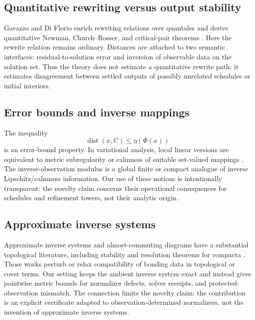 \documentclass[11pt]{article}
\theoremstyle{definition}
\theoremstyle{remark}
\numberwithin{equation}{section}
\newcommand{\dist}{\operatorname{dist}}
\begin{document}
\subsection{Quantitative rewriting versus output stability}

Gavazzo and Di Florio enrich rewriting relations over quantales and derive quantitative Newman, Church--Rosser, and critical-pair theorems \citep{GavazzoDiFlorio2022}.  Here the rewrite relation remains ordinary.  Distances are attached to two semantic interfaces: residual-to-solution error and inversion of observable data on the solution set.  Thus the theory does not estimate a quantitative rewrite path; it estimates disagreement between settled outputs of possibly unrelated schedules or initial interiors.

\subsection{Error bounds and inverse mappings}

The inequality
\[
 \dist(x,C)\le \eta(\Phi(x))
\]
is an error-bound property.  In variational analysis, local linear versions are equivalent to metric subregularity or calmness of suitable set-valued mappings \citep{Kruger2015,CibulkaDontchevKruger2018,DontchevRockafellar2014}.  The inverse-observation modulus is a global finite or compact analogue of inverse Lipschitz/calmness information.  Our use of these notions is intentionally transparent: the novelty claim concerns their operational consequences for schedules and refinement towers, not their analytic origin.

\subsection{Approximate inverse systems}

Approximate inverse systems and almost-commuting diagrams have a substantial
topological literature, including stability and resolution theorems for
compacta \citep{MardesicSegal1989,MardesicRubin1989,Mardesic1993}.  Those
works perturb or relax compatibility of bonding data in topological or cover
terms.  Our setting keeps the ambient inverse system exact and instead gives
pointwise metric bounds for normalizer defects, solver receipts, and
protected-observation mismatch.  The connection limits the novelty claim:
the contribution is an explicit certificate adapted to
observation-determined normalizers, not the invention of approximate inverse
systems.
\end{document}
